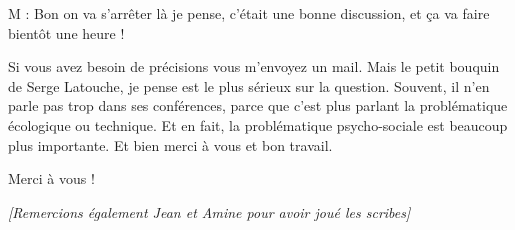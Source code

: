 \begin{description}
\vspace{1\baselineskip}

M : Bon on va s’arrêter là je pense, c'était une bonne discussion, et ça va faire bientôt une heure !

\vspace{1\baselineskip}

Si vous avez besoin de précisions vous m'envoyez un mail. Mais le petit bouquin de Serge Latouche, je pense est le plus sérieux sur la question. Souvent, il n'en parle pas trop dans ses conférences, parce que c'est plus parlant la problématique écologique ou technique. Et en fait, la problématique psycho-sociale est beaucoup plus importante. 
Et bien merci à vous et bon travail.

\vspace{1\baselineskip}

Merci à vous !


\end{description}

\textit{[Remercions également Jean et Amine pour avoir joué les scribes]}